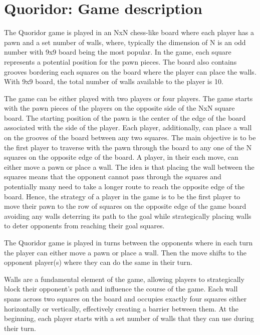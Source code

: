 \chapter{Quoridor: Game description}
\label{GameDescription}

The Quoridor game is played in an NxN chess-like board where each player has a pawn and a set number of walls, where, typically the dimension of N is an odd number with 9x9 board being the most popular. In the game, each square represents a potential position for the pawn pieces. The board also contains grooves bordering each squares on the board where the player can place the walls. With 9x9 board, the total number of walls available to the player is 10.

The game can be either played with two players or four players. The game starts with the pawn pieces of the players on the opposite side of the NxN square board. The starting position of the pawn is the center of the edge of the board associated with the side of the player. Each player, additionally, can place a wall on the grooves of the board between any two squares. The main objective is to be the first player to traverse with the pawn through the board to any one of the N squares on the opposite edge of the board. A player, in their each move, can either move a pawn or place a wall. The idea is that placing the wall between the squares means that the opponent cannot pass through the squares and potentially many need to take a longer route to reach the opposite edge of the board. Hence, the strategy of a player in the game is to be the first player to move
their pawn to the row of squares on the opposite edge of the game board avoiding any walls deterring its path to the goal while strategically placing walls to deter opponents from reaching their goal squares.

The Quoridor game is played in turns between the opponents where in each turn the player can either move a pawn or place a wall. Then the move shifts to the opponent player(s) where they can do the same in their turn.

Walls are a fundamental element of the game, allowing players to strategically block their opponent's path and influence the course of the game. Each wall spans across two squares on the board and occupies exactly four squares either horizontally or vertically, effectively creating a barrier between them. At the beginning, each player starts
with a set number of walls that they can use during their turn.

